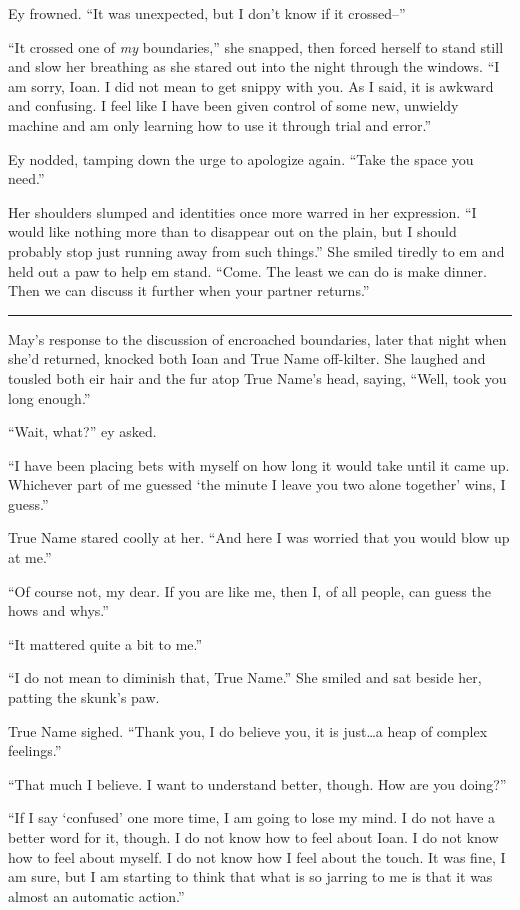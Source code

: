 Ey frowned. ``It was unexpected, but I don't know if it crossed--''

``It crossed one of \emph{my} boundaries,'' she snapped, then forced herself to stand still and slow her breathing as she stared out into the night through the windows. ``I am sorry, Ioan. I did not mean to get snippy with you. As I said, it is awkward and confusing. I feel like I have been given control of some new, unwieldy machine and am only learning how to use it through trial and error.''

Ey nodded, tamping down the urge to apologize again. ``Take the space you need.''

Her shoulders slumped and identities once more warred in her expression. ``I would like nothing more than to disappear out on the plain, but I should probably stop just running away from such things.'' She smiled tiredly to em and held out a paw to help em stand. ``Come. The least we can do is make dinner. Then we can discuss it further when your partner returns.''

\begin{center}\rule{0.5\linewidth}{0.5pt}\end{center}

May's response to the discussion of encroached boundaries, later that night when she'd returned, knocked both Ioan and True Name off-kilter. She laughed and tousled both eir hair and the fur atop True Name's head, saying, ``Well, took you long enough.''

``Wait, what?'' ey asked.

``I have been placing bets with myself on how long it would take until it came up. Whichever part of me guessed `the minute I leave you two alone together' wins, I guess.''

True Name stared coolly at her. ``And here I was worried that you would blow up at me.''

``Of course not, my dear. If you are like me, then I, of all people, can guess the hows and whys.''

``It mattered quite a bit to me.''

``I do not mean to diminish that, True Name.'' She smiled and sat beside her, patting the skunk's paw.

True Name sighed. ``Thank you, I do believe you, it is just\ldots a heap of complex feelings.''

``That much I believe. I want to understand better, though. How are you doing?''

``If I say `confused' one more time, I am going to lose my mind. I do not have a better word for it, though. I do not know how to feel about Ioan. I do not know how to feel about myself. I do not know how I feel about the touch. It was fine, I am sure, but I am starting to think that what is so jarring to me is that it was almost an automatic action.''


